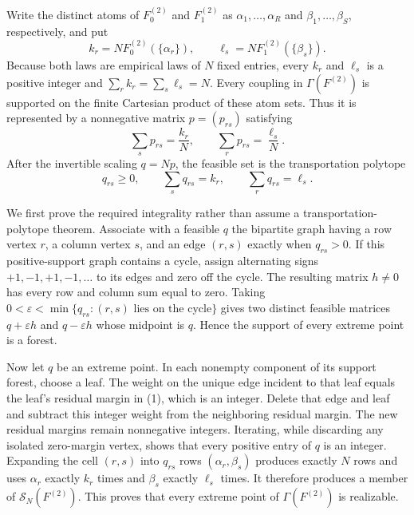 Write the distinct atoms of \(F_0^{(2)}\) and \(F_1^{(2)}\) as \(\alpha_1,\ldots,\alpha_R\) and \(\beta_1,\ldots,\beta_S\), respectively, and put
\[
k_r=NF_0^{(2)}(\{\alpha_r\}),\qquad
\ell_s=NF_1^{(2)}(\{\beta_s\}).
\]
Because both laws are empirical laws of \(N\) fixed entries, every \(k_r\) and \(\ell_s\) is a positive integer and
\(\sum_r k_r=\sum_s\ell_s=N\).  Every coupling in \(\Gamma(F^{(2)})\) is supported on the finite Cartesian product of these atom sets.  Thus it is represented by a nonnegative matrix \(p=(p_{rs})\) satisfying
\[
\sum_s p_{rs}=\frac{k_r}{N},\qquad
\sum_r p_{rs}=\frac{\ell_s}{N}.
\]
After the invertible scaling \(q=Np\), the feasible set is the transportation polytope
\[
q_{rs}\geq 0,\qquad \sum_s q_{rs}=k_r,\qquad \sum_r q_{rs}=\ell_s. \tag{1}
\]

We first prove the required integrality rather than assume a transportation-polytope theorem.  Associate with a feasible \(q\) the bipartite graph having a row vertex \(r\), a column vertex \(s\), and an edge \((r,s)\) exactly when \(q_{rs}>0\).  If this positive-support graph contains a cycle, assign alternating signs \(+1,-1,+1,-1,\ldots\) to its edges and zero off the cycle.  The resulting matrix \(h\neq0\) has every row and column sum equal to zero.  Taking
\(0<\varepsilon<\min\{q_{rs}:(r,s)\text{ lies on the cycle}\}\) gives two distinct feasible matrices \(q+\varepsilon h\) and \(q-\varepsilon h\) whose midpoint is \(q\).  Hence the support of every extreme point is a forest.

Now let \(q\) be an extreme point.  In each nonempty component of its support forest, choose a leaf.  The weight on the unique edge incident to that leaf equals the leaf's residual margin in (1), which is an integer.  Delete that edge and leaf and subtract this integer weight from the neighboring residual margin.  The new residual margins remain nonnegative integers.  Iterating, while discarding any isolated zero-margin vertex, shows that every positive entry of \(q\) is an integer.  Expanding the cell \((r,s)\) into \(q_{rs}\) rows \((\alpha_r,\beta_s)\) produces exactly \(N\) rows and uses \(\alpha_r\) exactly \(k_r\) times and \(\beta_s\) exactly \(\ell_s\) times.  It therefore produces a member of \(\mathcal S_N(F^{(2)})\).  This proves that every extreme point of \(\Gamma(F^{(2)})\) is realizable.

